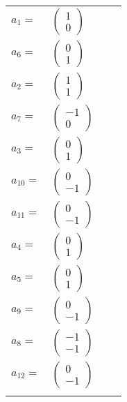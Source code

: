 \documentclass[1p]{elsarticle_modified}
\theoremstyle{definition}
\begin{document}
\begin{tabular}{m{7pt} m{180pt} m{7pt} m{180pt} }
\flushright $a_{1}=$&$\begin{pmatrix}1\\0\end{pmatrix}$ \\
\flushright $a_{6}=$&$\begin{pmatrix}0\\1\end{pmatrix}$ \\
\flushright $a_{2}=$&$\begin{pmatrix}1\\1\end{pmatrix}$ \\
\flushright $a_{7}=$&$\begin{pmatrix}-1\\0\end{pmatrix}$ \\
\flushright $a_{3}=$&$\begin{pmatrix}0\\1\end{pmatrix}$ \\
\flushright $a_{10}=$&$\begin{pmatrix}0\\-1\end{pmatrix}$ \\
\flushright $a_{11}=$&$\begin{pmatrix}0\\-1\end{pmatrix}$ \\
\flushright $a_{4}=$&$\begin{pmatrix}0\\1\end{pmatrix}$ \\
\flushright $a_{5}=$&$\begin{pmatrix}0\\1\end{pmatrix}$ \\
\flushright $a_{9}=$&$\begin{pmatrix}0\\-1\end{pmatrix}$ \\
\flushright $a_{8}=$&$\begin{pmatrix}-1\\-1\end{pmatrix}$ \\
\flushright $a_{12}=$&$\begin{pmatrix}0\\-1\end{pmatrix}$\\&\end{tabular}
\end{document}
